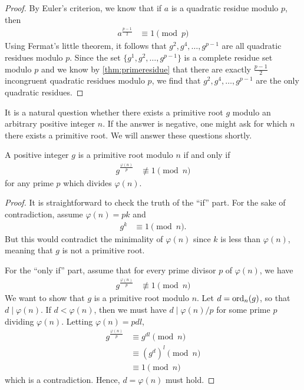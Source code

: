 \documentclass{subfile}
\begin{document}
	\begin{proof}
		By Euler's criterion, we know that if $a$ is a quadratic residue modulo $p$, then
			\begin{align*}
				a^{\frac{p-1}{2}}
					& \equiv 1 \pmod p
			\end{align*}
		Using Fermat's little theorem, it follows that $g^2,g^4,\ldots,g^{p-1}$ are all quadratic residues modulo $p$. Since the set $\{g^1,g^2,\ldots,g^{p-1}\}$ is a complete residue set modulo $p$ and we know by \autoref{thm:primeresidue} that there are exactly $\frac{p-1}{2}$ incongruent quadratic residues modulo $p$, we find that $g^2,g^4,\ldots,g^{p-1}$ are the only quadratic residues.
	\end{proof}
It is a natural question whether there exists a primitive root $g$ modulo an arbitrary positive integer $n$. If the answer is negative, one might ask for which $n$ there exists a primitive root. We will answer these questions shortly.
	\begin{theorem}\label{thm:prTest}
		A positive integer $g$ is a primitive root modulo $n$ if and only if
			\begin{align*}
				g^{\frac{\varphi(n)}{p}}
					& \not\equiv1\pmod n
			\end{align*}
		for any prime $p$ which divides $\varphi(n)$.
	\end{theorem}

	\begin{proof}
		It is straightforward to check the truth of the ``if'' part. For the sake of contradiction, assume $\varphi(n)=pk$ and
			\begin{align*}
				g^{k} & \equiv1\pmod n.
			\end{align*}
		But this would contradict the minimality of $\varphi(n)$ since $k$ is less than $\varphi(n)$, meaning that $g$ is not a primitive root.

		For the ``only if'' part, assume that for every prime divisor $p$ of $\varphi(n)$, we have
			\begin{align*}
				g^{\frac{\varphi(n)}{p}}
					& \not\equiv1\pmod n
			\end{align*}
		We want to show that $g$ is a primitive root modulo $n$. Let $d=\operatorname{ord}_n(g)$, so that $d \mid \varphi(n)$. If $d<\varphi(n)$, then we must have $d\mid {\varphi(n)}/{p}$ for some prime $p$ dividing $\varphi(n)$. Letting $\varphi(n)=pdl$,
			\begin{align*}
				g^{\frac{\varphi(n)}{p}}
					& \equiv g^{dl}\pmod{n}\\
					& \equiv \left(g^d\right)^l\pmod{n}\\
					& \equiv1\pmod n
			\end{align*}
		which is a contradiction. Hence, $d=\varphi(n)$ must hold.
	\end{proof}
\end{document}
